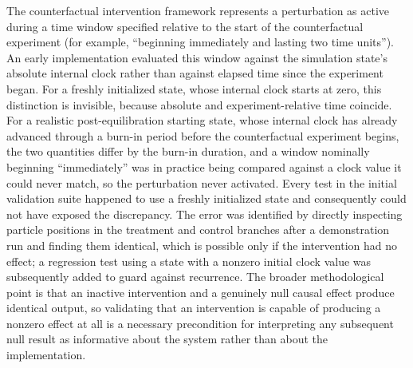 \documentclass[11pt]{article}
\begin{document}
The counterfactual intervention framework represents a perturbation as active during a time window specified relative to the start of the counterfactual experiment (for example, ``beginning immediately and lasting two time units''). An early implementation evaluated this window against the simulation state's absolute internal clock rather than against elapsed time since the experiment began. For a freshly initialized state, whose internal clock starts at zero, this distinction is invisible, because absolute and experiment-relative time coincide. For a realistic post-equilibration starting state, whose internal clock has already advanced through a burn-in period before the counterfactual experiment begins, the two quantities differ by the burn-in duration, and a window nominally beginning ``immediately'' was in practice being compared against a clock value it could never match, so the perturbation never activated. Every test in the initial validation suite happened to use a freshly initialized state and consequently could not have exposed the discrepancy. The error was identified by directly inspecting particle positions in the treatment and control branches after a demonstration run and finding them identical, which is possible only if the intervention had no effect; a regression test using a state with a nonzero initial clock value was subsequently added to guard against recurrence. The broader methodological point is that an inactive intervention and a genuinely null causal effect produce identical output, so validating that an intervention is capable of producing a nonzero effect at all is a necessary precondition for interpreting any subsequent null result as informative about the system rather than about the implementation.
\end{document}
